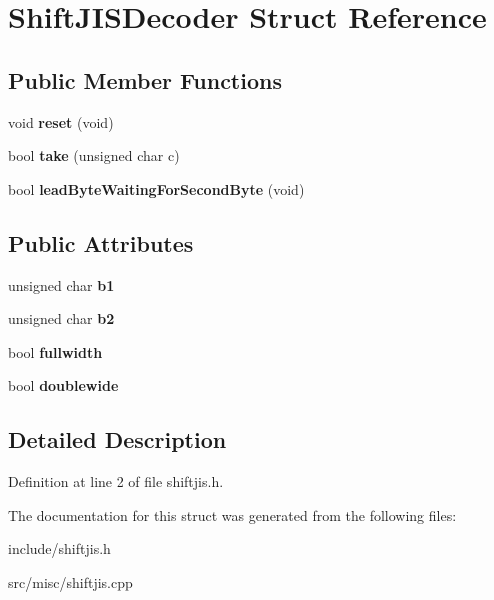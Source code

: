 \hypertarget{structShiftJISDecoder}{\section{Shift\-J\-I\-S\-Decoder Struct Reference}
\label{structShiftJISDecoder}
}
\subsection*{Public Member Functions}
\begin{DoxyCompactItemize}
\item 
\hypertarget{structShiftJISDecoder_a5644a78a4d924ebb88e6c3cc03c81bfa}{void {\bfseries reset} (void)}\label{structShiftJISDecoder_a5644a78a4d924ebb88e6c3cc03c81bfa}

\item 
\hypertarget{structShiftJISDecoder_a7bcbb2220af2a5e822e67eac60dcac7c}{bool {\bfseries take} (unsigned char c)}\label{structShiftJISDecoder_a7bcbb2220af2a5e822e67eac60dcac7c}

\item 
\hypertarget{structShiftJISDecoder_af34a5dbc6ef7afa9a2eb481edc6eff42}{bool {\bfseries lead\-Byte\-Waiting\-For\-Second\-Byte} (void)}\label{structShiftJISDecoder_af34a5dbc6ef7afa9a2eb481edc6eff42}

\end{DoxyCompactItemize}
\subsection*{Public Attributes}
\begin{DoxyCompactItemize}
\item 
\hypertarget{structShiftJISDecoder_aaea1264d43f49a9466f638e097dce19d}{unsigned char {\bfseries b1}}\label{structShiftJISDecoder_aaea1264d43f49a9466f638e097dce19d}

\item 
\hypertarget{structShiftJISDecoder_abf6d4dece1d6b87d206f27d15a3217d0}{unsigned char {\bfseries b2}}\label{structShiftJISDecoder_abf6d4dece1d6b87d206f27d15a3217d0}

\item 
\hypertarget{structShiftJISDecoder_ad913a308dbb1f9c79602f479daa6185b}{bool {\bfseries fullwidth}}\label{structShiftJISDecoder_ad913a308dbb1f9c79602f479daa6185b}

\item 
\hypertarget{structShiftJISDecoder_ae12636daf9c132f8b8efc974a66a95d8}{bool {\bfseries doublewide}}\label{structShiftJISDecoder_ae12636daf9c132f8b8efc974a66a95d8}

\end{DoxyCompactItemize}


\subsection{Detailed Description}


Definition at line 2 of file shiftjis.\-h.



The documentation for this struct was generated from the following files\-:\begin{DoxyCompactItemize}
\item 
include/shiftjis.\-h\item 
src/misc/shiftjis.\-cpp\end{DoxyCompactItemize}

